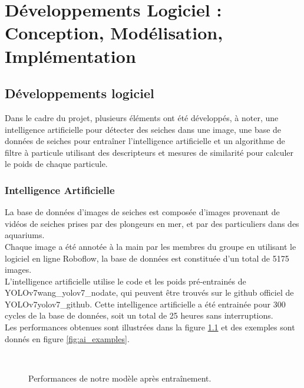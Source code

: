 \pagestyle{plain}
\chapter{Développements Logiciel : Conception, Modélisation, Implémentation} 

\section{Développements logiciel}
Dans le cadre du projet, plusieurs éléments ont été développés, à noter, une intelligence artificielle pour détecter des seiches dans une image, une base de données de seiches pour entraîner l'intelligence artificielle et un algorithme de filtre à particule utilisant des descripteurs et mesures de similarité pour calculer le poids de chaque particule.\\

\subsection{Intelligence Artificielle}
La base de données d'images de seiches est composée d'images provenant de vidéos de seiches prises par des plongeurs en mer, et par des particuliers dans des aquariums.\\
Chaque image a été annotée à la main par les membres du groupe en utilisant le logiciel en ligne Roboflow, la base de données est constituée d'un total de 5175 images.\\
L'intelligence artificielle utilise le code et les poids pré-entrainés de YOLOv7{wang_yolov7_nodate}, qui peuvent être trouvés sur le github officiel de YOLOv7{yolov7_github}.
Cette intelligence artificielle a été entrainée pour 300 cycles de la base de données, soit un total de 25 heures sans interruptions.\\
Les performances obtenues sont illustrées dans la figure \ref{fig:ai_results} et des exemples sont donnés en figure \ref{fig:ai_examples}.\\

\begin{figure}[!htbp]
\center
	\\
\caption{Performances de notre modèle après entraînement.}
\label{fig:ai_results}
\end{figure}
\FloatBarrier

